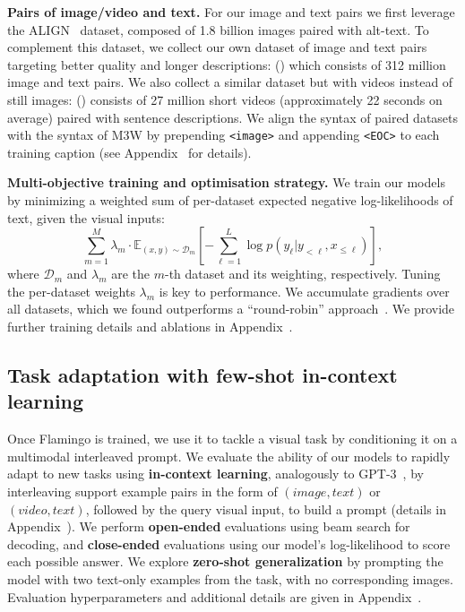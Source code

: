 \textbf{Pairs of image/video and text.}
For our image and text pairs we first leverage the ALIGN~\citep{align} dataset, composed of 1.8 billion images paired with alt-text.
To complement this dataset,  we collect our own dataset of image and text pairs targeting better quality and longer descriptions:  \shortimagetextpairs{} (\imagetextpairs) which consists of 312 million image and text pairs.
We also collect a similar dataset but with videos instead of still images: \shortvideotextpairs{} (\videotextpairs) consists of 27 million short videos (approximately 22 seconds on average) paired with sentence descriptions.
We align the syntax of paired datasets with the syntax of M3W by prepending \texttt{<image>} and appending \texttt{<EOC>} to each training caption (see Appendix~ for details).



\textbf{Multi-objective training and optimisation strategy.}
We train our models by minimizing a weighted sum of per-dataset expected negative log-likelihoods of text, given the visual inputs:
\begin{equation}
    \sum_{m=1}^{M} \lambda_m \cdot \mathbb{E}_{(x, y)\sim \mathcal{D}_m} \left[ -\sum_{\ell=1}^L \log p(y_\ell | y_{< \ell}, x_{\leq \ell})\right],
\end{equation}
where $\mathcal{D}_m$ and $\lambda_m$ are the $m$-th dataset and
its weighting, respectively.
Tuning the per-dataset weights $\lambda_m$ is key to performance.
We accumulate gradients over all datasets, which we found outperforms a ``round-robin'' approach~\citep{cho2021unifying}.
We provide further training details and ablations in Appendix~.

\subsection{Task adaptation with few-shot in-context learning}
\label{sec:adapt-vlm}

Once Flamingo is trained, we use it to tackle a visual task by conditioning it on a multimodal interleaved prompt. %
We evaluate the ability of our models to rapidly adapt to new tasks using \textbf{in-context learning}, analogously to GPT-3~\citep{gpt3}, by interleaving support example pairs in the form of $(image, text)$ or $(video, text)$, followed by the query visual input, to build a prompt (details in Appendix~).
We perform \textbf{open-ended} evaluations using beam search for decoding, and \textbf{close-ended} evaluations using our model's log-likelihood to score each possible answer.
We explore \textbf{zero-shot generalization} by prompting the model with two text-only examples from the task, with no corresponding images.
Evaluation hyperparameters and additional details are given in Appendix~.



